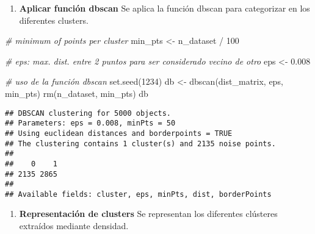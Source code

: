 \documentclass[
]{article}
\newenvironment{Shaded}{\begin{snugshade}}{\end{snugshade}}
\newcommand{\AttributeTok}[1]{\textcolor[rgb]{0.77,0.63,0.00}{#1}}
\newcommand{\CommentTok}[1]{\textcolor[rgb]{0.56,0.35,0.01}{\textit{#1}}}
\newcommand{\DecValTok}[1]{\textcolor[rgb]{0.00,0.00,0.81}{#1}}
\newcommand{\FloatTok}[1]{\textcolor[rgb]{0.00,0.00,0.81}{#1}}
\newcommand{\FunctionTok}[1]{\textcolor[rgb]{0.00,0.00,0.00}{#1}}
\newcommand{\NormalTok}[1]{#1}
\newcommand{\OtherTok}[1]{\textcolor[rgb]{0.56,0.35,0.01}{#1}}
\newcommand{\SpecialCharTok}[1]{\textcolor[rgb]{0.00,0.00,0.00}{#1}}
\providecommand{\tightlist}{%
  \setlength{\itemsep}{0pt}\setlength{\parskip}{0pt}}
\begin{document}
\begin{enumerate}
\def\labelenumi{\arabic{enumi}.}
\setcounter{enumi}{2}
\tightlist
\item
  \textbf{Aplicar función dbscan} Se aplica la función dbscan para
  categorizar en los diferentes clusters.
\end{enumerate}

\begin{Shaded}
\begin{Highlighting}[]
\CommentTok{\# minimum of points per cluster}
\NormalTok{min\_pts }\OtherTok{\textless{}{-}}\NormalTok{ n\_dataset }\SpecialCharTok{/} \DecValTok{100}

\CommentTok{\# eps: max. dist. entre 2 puntos para ser considerado vecino de otro}
\NormalTok{eps }\OtherTok{\textless{}{-}} \FloatTok{0.008}

\CommentTok{\# uso de la función dbscan}
\FunctionTok{set.seed}\NormalTok{(}\DecValTok{1234}\NormalTok{)}
\NormalTok{db }\OtherTok{\textless{}{-}} \FunctionTok{dbscan}\NormalTok{(dist\_matrix, eps, min\_pts)}
\FunctionTok{rm}\NormalTok{(n\_dataset, min\_pts)}
\NormalTok{db}
\end{Highlighting}
\end{Shaded}

\begin{verbatim}
## DBSCAN clustering for 5000 objects.
## Parameters: eps = 0.008, minPts = 50
## Using euclidean distances and borderpoints = TRUE
## The clustering contains 1 cluster(s) and 2135 noise points.
## 
##    0    1 
## 2135 2865 
## 
## Available fields: cluster, eps, minPts, dist, borderPoints
\end{verbatim}

\begin{enumerate}
\def\labelenumi{\arabic{enumi}.}
\setcounter{enumi}{3}
\tightlist
\item
  \textbf{Representación de clusters} Se representan los diferentes
  clústeres extraídos mediante densidad.
\end{enumerate}

\begin{Shaded}
\end{Shaded}
\end{document}
